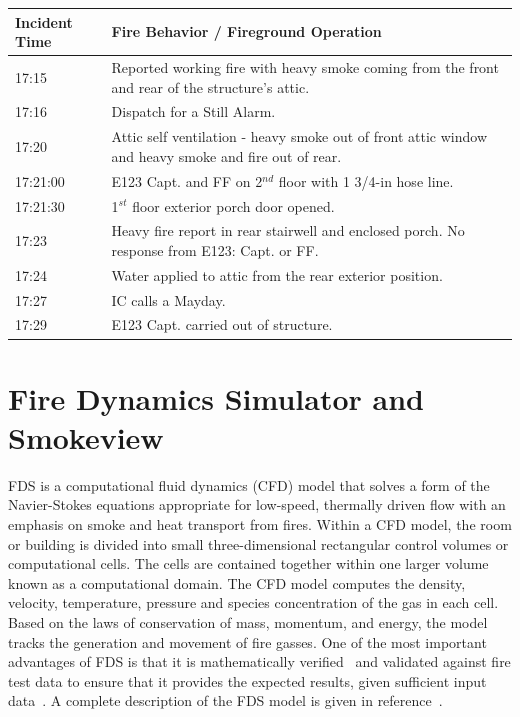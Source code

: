 \documentclass[11pt,oneside]{book}
\begin{document}
\begin{table}
\centering
{}\label{tab:fire_info}
\begin{tabular}{l l}
\toprule[1.5pt]
Incident Time & Fire Behavior / Fireground Operation  \\
\midrule
\multirow{2}{*}{17:15} & \multirow{2}{*}{\parbox{10cm} {Reported working fire with heavy smoke coming from the front and rear of the structure's attic.}} \\ 
         & \\[.25cm] %
17:16    & Dispatch for a Still Alarm. \\ [.25cm]
\multirow{2}{*}{17:20}    & \multirow{2}{*}{\parbox{10cm} {Attic self ventilation - heavy smoke out of front attic window and heavy smoke and fire out of rear.}} \\
         & \\[.25cm] 
17:21:00 & E123 Capt. and FF on 2$^{nd}$ floor with 1 3/4-in hose line. \\[.25cm]
17:21:30 & 1$^{st}$ floor exterior porch door opened. \\[.25cm]
\multirow{2}{*}{17:23}    & \multirow{2}{*}{\parbox{10cm} {Heavy fire report in rear stairwell and enclosed porch. No response from E123: Capt. or FF.}} \\
         & \\[.25cm]
17:24    & Water applied to attic from the rear exterior position. \\[.25cm]
17:27    & IC calls a Mayday. \\[.25cm]
17:29    & E123 Capt. carried out of structure. \\
\bottomrule[1.25pt]
\end{tabular}\par
\end{table}
 

\chapter{Fire Dynamics Simulator and Smokeview}
FDS is a computational fluid dynamics (CFD) model that solves a form of the Navier-Stokes equations appropriate for low-speed, thermally driven flow with an emphasis on smoke and heat transport from fires.  Within a CFD model, the room or building is divided into small three-dimensional rectangular control volumes or computational cells.  The cells are contained together within one larger volume known as a computational domain.  The CFD model computes the density, velocity, temperature, pressure and species concentration of the gas in each cell.  Based on the laws of conservation of mass, momentum,  and energy, the model tracks the generation and movement of fire gasses. One of the most important advantages of FDS is that it is  mathematically verified~\cite{FDS_Verification_Guide} and validated against fire test data to ensure that it provides the expected results, given sufficient input data~\cite{FDS_Validation_Guide}.  A complete description of the FDS model is given in reference~\cite{FDS_Math_Guide}.
\end{document}
